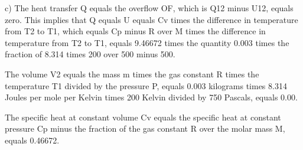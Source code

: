 c) The heat transfer Q equals the overflow OF, which is Q12 minus U12, equals zero. This implies that Q equals U equals Cv times the difference in temperature from T2 to T1, which equals Cp minus R over M times the difference in temperature from T2 to T1, equals 9.46672 times the quantity 0.003 times the fraction of 8.314 times 200 over 500 minus 500.

The volume V2 equals the mass m times the gas constant R times the temperature T1 divided by the pressure P, equals 0.003 kilograms times 8.314 Joules per mole per Kelvin times 200 Kelvin divided by 750 Pascals, equals 0.00.

The specific heat at constant volume Cv equals the specific heat at constant pressure Cp minus the fraction of the gas constant R over the molar mass M, equals 0.46672.